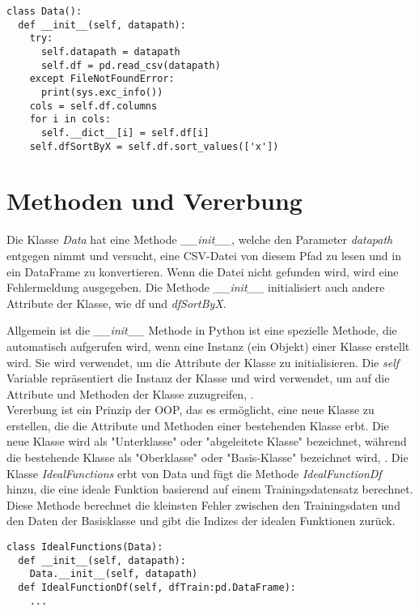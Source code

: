 \begin{lstlisting}[caption={class Data}, captionpos=b, label={lst:class data}]
class Data():
  def __init__(self, datapath):
    try:
      self.datapath = datapath
      self.df = pd.read_csv(datapath)
    except FileNotFoundError:
      print(sys.exc_info())
    cols = self.df.columns
    for i in cols:
      self.__dict__[i] = self.df[i]
    self.dfSortByX = self.df.sort_values(['x'])
\end{lstlisting}

\section{Methoden und Vererbung}
Die Klasse \textit{Data} hat eine Methode \textit{\_\_init\_\_}, welche den Parameter \textit{datapath} entgegen nimmt und versucht, eine CSV-Datei von diesem Pfad zu lesen und in ein DataFrame zu konvertieren. Wenn die Datei nicht gefunden wird, wird eine Fehlermeldung ausgegeben. Die Methode \textit{\_\_init\_\_} initialisiert auch andere Attribute der Klasse, wie df und \textit{dfSortByX}.

Allgemein ist die \textit{\_\_init\_\_} Methode in Python ist eine spezielle Methode, die automatisch aufgerufen wird, wenn eine Instanz (ein Objekt) einer Klasse erstellt wird. Sie wird verwendet, um die Attribute der Klasse zu initialisieren. Die \textit{self} Variable repräsentiert die Instanz der Klasse und wird verwendet, um auf die Attribute und Methoden der Klasse zuzugreifen, \cite{Häberlein:2024}. \\

Vererbung ist ein Prinzip der OOP, das es ermöglicht, eine neue Klasse zu erstellen, die die Attribute und Methoden einer bestehenden Klasse erbt. Die neue Klasse wird als "Unterklasse" oder "abgeleitete Klasse" bezeichnet, während die bestehende Klasse als "Oberklasse" oder "Basis-Klasse" bezeichnet wird, \cite{Steyer:2018}.
Die Klasse \textit{IdealFunctions} erbt von Data und fügt die Methode \textit{IdealFunctionDf} hinzu, die eine ideale Funktion basierend auf einem Trainingsdatensatz berechnet. Diese Methode berechnet die kleinsten Fehler zwischen den Trainingsdaten und den Daten der Basisklasse und gibt die Indizes der idealen Funktionen zurück.

\begin{lstlisting}[caption={class IdealFunctions}, captionpos=b, label={lst:class IdealFcns}]
class IdealFunctions(Data):
  def __init__(self, datapath):
    Data.__init__(self, datapath)
  def IdealFunctionDf(self, dfTrain:pd.DataFrame):
    ...
\end{lstlisting}

